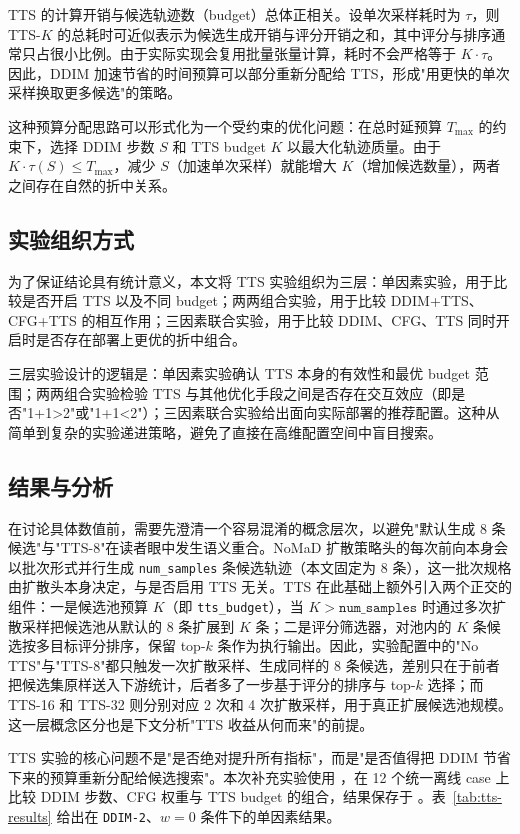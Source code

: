 TTS 的计算开销与候选轨迹数（budget）总体正相关。设单次采样耗时为 $\tau$，则 TTS-$K$ 的总耗时可近似表示为候选生成开销与评分开销之和，其中评分与排序通常只占很小比例。由于实际实现会复用批量张量计算，耗时不会严格等于 $K \cdot \tau$。因此，DDIM 加速节省的时间预算可以部分重新分配给 TTS，形成"用更快的单次采样换取更多候选"的策略。

这种预算分配思路可以形式化为一个受约束的优化问题：在总时延预算 $T_{\max}$ 的约束下，选择 DDIM 步数 $S$ 和 TTS budget $K$ 以最大化轨迹质量。由于 $K \cdot \tau(S) \leq T_{\max}$，减少 $S$（加速单次采样）就能增大 $K$（增加候选数量），两者之间存在自然的折中关系。

\subsection{实验组织方式}

为了保证结论具有统计意义，本文将 TTS 实验组织为三层：单因素实验，用于比较是否开启 TTS 以及不同 budget；两两组合实验，用于比较 DDIM+TTS、CFG+TTS 的相互作用；三因素联合实验，用于比较 DDIM、CFG、TTS 同时开启时是否存在部署上更优的折中组合。

三层实验设计的逻辑是：单因素实验确认 TTS 本身的有效性和最优 budget 范围；两两组合实验检验 TTS 与其他优化手段之间是否存在交互效应（即是否"1+1>2"或"1+1<2"）；三因素联合实验给出面向实际部署的推荐配置。这种从简单到复杂的实验递进策略，避免了直接在高维配置空间中盲目搜索。

\subsection{结果与分析}

在讨论具体数值前，需要先澄清一个容易混淆的概念层次，以避免"默认生成 8 条候选"与"TTS-8"在读者眼中发生语义重合。NoMaD 扩散策略头的每次前向本身会以批次形式并行生成 \texttt{num\_samples} 条候选轨迹（本文固定为 8 条），这一批次规格由扩散头本身决定，与是否启用 TTS 无关。TTS 在此基础上额外引入两个正交的组件：一是候选池预算 $K$（即 \texttt{tts\_budget}），当 $K > \texttt{num\_samples}$ 时通过多次扩散采样把候选池从默认的 8 条扩展到 $K$ 条；二是评分筛选器，对池内的 $K$ 条候选按多目标评分排序，保留 top-$k$ 条作为执行输出。因此，实验配置中的"No TTS"与"TTS-8"都只触发一次扩散采样、生成同样的 8 条候选，差别只在于前者把候选集原样送入下游统计，后者多了一步基于评分的排序与 top-$k$ 选择；而 TTS-16 和 TTS-32 则分别对应 2 次和 4 次扩散采样，用于真正扩展候选池规模。这一层概念区分也是下文分析"TTS 收益从何而来"的前提。

TTS 实验的核心问题不是"是否绝对提升所有指标"，而是"是否值得把 DDIM 节省下来的预算重新分配给候选搜索"。本次补充实验使用 ，在 12 个统一离线 case 上比较 DDIM 步数、CFG 权重与 TTS budget 的组合，结果保存于 。表~\ref{tab:tts-results} 给出在 \texttt{DDIM-2}、$w=0$ 条件下的单因素结果。

